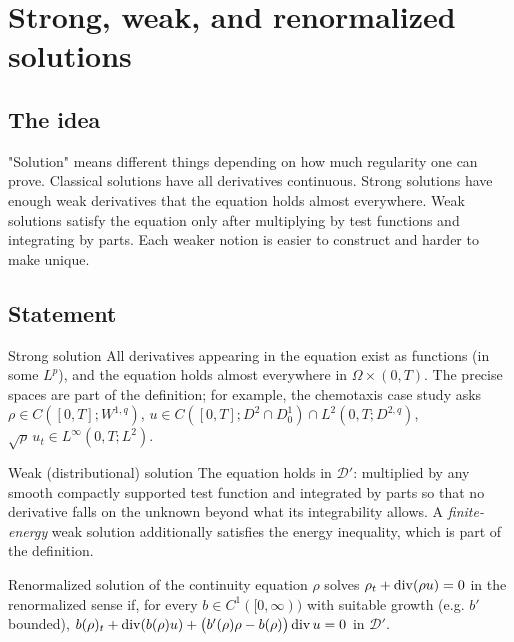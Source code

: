 
\section{Strong, weak, and renormalized solutions}\label{p:notions-of-solution}


\subsection*{The idea}

"Solution" means different things depending on how much regularity one can prove. Classical solutions have all derivatives continuous. Strong solutions have enough weak derivatives that the equation holds almost everywhere. Weak solutions satisfy the equation only after multiplying by test functions and integrating by parts. Each weaker notion is easier to construct and harder to make unique.

\subsection*{Statement}

\begin{defnbox}{Strong solution}
%
All derivatives appearing in the equation exist as functions (in some $L^p$), and the equation holds almost everywhere in $\Omega\times(0,T)$. The precise spaces are part of the definition; for example, the chemotaxis case study asks $\rho\in C([0,T];W^{1,q})$, $u\in C([0,T];D^2\cap D^1_0)\cap L^2(0,T;D^{2,q})$, $\sqrt\rho\,u_t\in L^\infty(0,T;L^2)$.
\end{defnbox}

\begin{defnbox}{Weak (distributional) solution}
%
The equation holds in $\mathcal{D}'$: multiplied by any smooth compactly supported test function and integrated by parts so that no derivative falls on the unknown beyond what its integrability allows. A \emph{finite-energy} weak solution additionally satisfies the energy inequality, which is part of the definition.
\end{defnbox}

\begin{defnbox}{Renormalized solution of the continuity equation}
%
$\rho$ solves $\rho_t+\operatorname{div}(\rho u)=0$ in the renormalized sense if, for every $b\in C^1([0,\infty))$ with suitable growth (e.g. $b'$ bounded), $b(\rho)_t+\operatorname{div}(b(\rho)u)+\big(b'(\rho)\rho-b(\rho)\big)\operatorname{div} u=0$ in $\mathcal{D}'$.
\end{defnbox}

